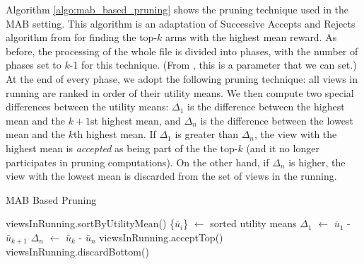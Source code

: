 Algorithm \ref{algo:mab_based_pruning} shows the pruning technique used in the
MAB setting.
This algorithm is an adaptation of Successive Accepts and Rejects
algorithm from \cite{BubeckWV13} for finding the top-$k$ arms with the highest
mean reward.
As before, the processing of the whole file is divided into phases, with the
number of phases set to $k$-1 for this technique.
(From \cite{BubeckWV13}, this is a parameter that we can set.)
At the end of every phase, we adopt the following pruning technique: all views
in running are ranked in order of their utility means. 
We then compute two special differences between the utility means: $\Delta_1$
is the difference between the highest mean and the $k+1$st highest mean, and
$\Delta_n$ is the difference between the lowest mean and the $k$th highest mean.
If $\Delta_1$ is greater than $\Delta_n$, the view with the highest mean is
{\it accepted} as being part of the the top-$k$ (and it no longer participates
in pruning computations).
On the other hand, if $\Delta_n$ is higher, the view with the lowest mean is discarded
from the set of views in the running.

\begin{algorithm}
\caption{MAB Based Pruning}
\label{algo:mab_based_pruning}
\begin{algorithmic}[1]
\State viewsInRunning.sortByUtilityMean()
\State \{$\bar{u}_{i}$\} $\gets$ sorted utility means
\State $\Delta_1$ $\gets$ $\bar{u}_{1}$ - $\bar{u}_{k+1}$
\State $\Delta_n$ $\gets$ $\bar{u}_{k}$ - $\bar{u}_{n}$
\State viewsInRunning.acceptTop()
\Else
\State viewsInRunning.discardBottom()
\EndIf
\end{algorithmic}
\end{algorithm}

